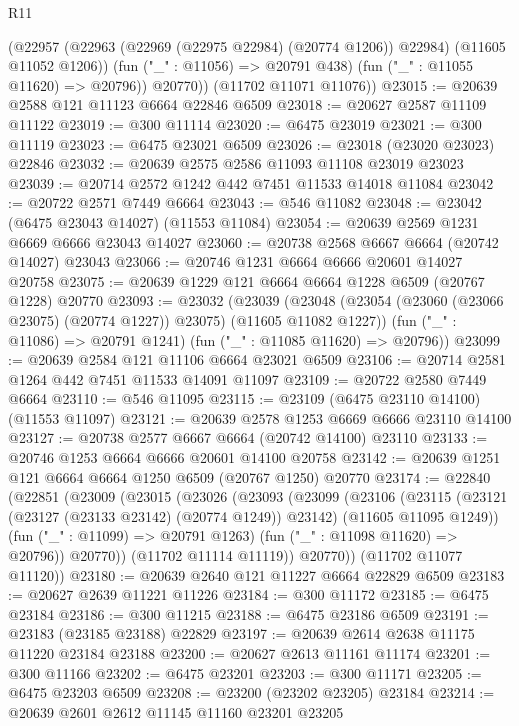 \begin{lexlean}{R11}
\begin{coremodule}
{{{{{{{{{{{{{{{{{{{{{{{{{{{{{{{{{{{{{{{{{{{{{{{{{{{{{{{{{{{{{{{{{{{{{{{{{{{{{{{{{{            (@22957 (@22963 (@22969 (@22975 @22984) (@20774 @1206)) @22984) (@11605 @11052 @1206))
            (fun ("_" : @11056) => @20791 @438)
            (fun ("_" : @11055 @11620) => @20796))
          @20770))
      (@11702 @11071 @11076))
@23015 := @20639 @2588 @121 @11123 @6664 @22846 @6509
@23018 := @20627 @2587 @11109 @11122
@23019 := @300 @11114
@23020 := @6475 @23019
@23021 := @300 @11119
@23023 := @6475 @23021 @6509
@23026 := @23018 (@23020 @23023) @22846
@23032 := @20639 @2575 @2586 @11093 @11108 @23019 @23023
@23039 := @20714 @2572 @1242 @442 @7451 @11533 @14018 @11084
@23042 := @20722 @2571 @7449 @6664
@23043 := @546 @11082
@23048 := @23042 (@6475 @23043 @14027) (@11553 @11084)
@23054 := @20639 @2569 @1231 @6669 @6666 @23043 @14027
@23060 := @20738 @2568 @6667 @6664 (@20742 @14027) @23043
@23066 := @20746 @1231 @6664 @6666 @20601 @14027 @20758
@23075 := @20639 @1229 @121 @6664 @6664 @1228 @6509 (@20767 @1228) @20770
@23093 := @23032
    (@23039
      (@23048 (@23054 (@23060 (@23066 @23075) (@20774 @1227)) @23075) (@11605 @11082 @1227))
      (fun ("_" : @11086) => @20791 @1241)
      (fun ("_" : @11085 @11620) => @20796))
@23099 := @20639 @2584 @121 @11106 @6664 @23021 @6509
@23106 := @20714 @2581 @1264 @442 @7451 @11533 @14091 @11097
@23109 := @20722 @2580 @7449 @6664
@23110 := @546 @11095
@23115 := @23109 (@6475 @23110 @14100) (@11553 @11097)
@23121 := @20639 @2578 @1253 @6669 @6666 @23110 @14100
@23127 := @20738 @2577 @6667 @6664 (@20742 @14100) @23110
@23133 := @20746 @1253 @6664 @6666 @20601 @14100 @20758
@23142 := @20639 @1251 @121 @6664 @6664 @1250 @6509 (@20767 @1250) @20770
@23174 := @22840
    (@22851
      (@23009
        (@23015
          (@23026
            (@23093
              (@23099
                (@23106
                  (@23115
                    (@23121 (@23127 (@23133 @23142) (@20774 @1249)) @23142)
                    (@11605 @11095 @1249))
                  (fun ("_" : @11099) => @20791 @1263)
                  (fun ("_" : @11098 @11620) => @20796))
                @20770))
            (@11702 @11114 @11119))
          @20770))
      (@11702 @11077 @11120))
@23180 := @20639 @2640 @121 @11227 @6664 @22829 @6509
@23183 := @20627 @2639 @11221 @11226
@23184 := @300 @11172
@23185 := @6475 @23184
@23186 := @300 @11215
@23188 := @6475 @23186 @6509
@23191 := @23183 (@23185 @23188) @22829
@23197 := @20639 @2614 @2638 @11175 @11220 @23184 @23188
@23200 := @20627 @2613 @11161 @11174
@23201 := @300 @11166
@23202 := @6475 @23201
@23203 := @300 @11171
@23205 := @6475 @23203 @6509
@23208 := @23200 (@23202 @23205) @23184
@23214 := @20639 @2601 @2612 @11145 @11160 @23201 @23205
}}}}}}}}}}}}}}}}}}}}}}}}}}}}}}}}}}}}}}}}}}}}}}}}}}}}}}}}}}}}}}}}}}}}}}}}}}}}}}}}}}
\end{coremodule}
\end{lexlean}
